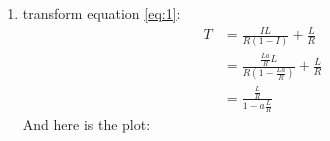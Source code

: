 \begin{enumerate}
\begin{enumerate}
		\item transform equation \ref{eq:1}:
		\begin{equation}
			\begin{split}
				T & = \frac{I L}{R (1 - I)} + \frac{L}{R} \\ 
				  & = \frac{\frac{L a}{R} L}{R (1 - \frac{L a}{R})} + \frac{L}{R} \\ 
				  & = \frac{\frac{L}{R}}{1 - a \frac{L}{R}}
			\end{split}
		\end{equation}
		And here is the plot:
		\begin{center}
		\end{center}
	\end{enumerate}
\end{enumerate}